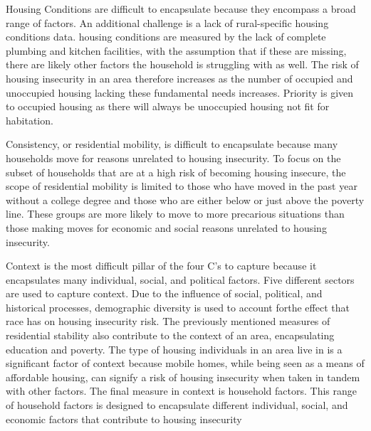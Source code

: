 Housing Conditions are difficult to encapsulate because they encompass a broad range of factors. An additional challenge is a lack of rural-specific housing conditions data. housing conditions are measured by the lack of complete plumbing and kitchen facilities, with the assumption that if these are missing, there are likely other factors the household is struggling with as well. The risk of housing insecurity in an area therefore increases as the number of occupied and unoccupied housing lacking these fundamental needs increases. Priority is given to occupied housing as there will always be unoccupied housing not fit for habitation. 

Consistency, or residential mobility, is difficult to encapsulate because many households move for reasons unrelated to housing insecurity. To focus on the subset of households that are at a high risk of becoming housing insecure, the scope of residential mobility is limited to those who have moved in the past year without a college degree and those who are either below or just above the poverty line. These groups are more likely to move to more precarious situations than those making moves for economic and social reasons unrelated to housing insecurity. 

Context is the most difficult pillar of the four C's to capture because it encapsulates many individual, social, and political factors. Five different sectors are used to capture context. Due to the influence of social, political, and historical processes, demographic diversity is used to account forthe effect that race has on housing insecurity risk. The previously mentioned measures of residential stability also contribute to the context of an area, encapsulating education and poverty. The type of housing individuals in an area live in is a significant factor of context because mobile homes, while being seen as a means of affordable housing, can signify a risk of housing insecurity when taken in tandem with other factors. The final measure in context is household factors. This range of household factors is designed to encapsulate different individual, social, and economic factors that contribute to housing insecurity 

